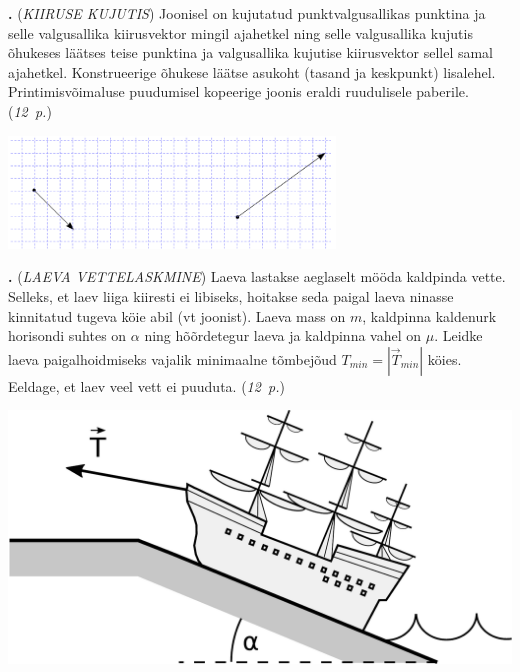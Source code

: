 \documentclass[11pt,a5paper]{article}
\newcommand{\numb}[1]{\vspace{5pt}\textbf{\large #1}}
\newcommand{\nimi}[1]{(\textsl{\small #1})}
\newcommand{\punktid}[1]{(\emph{#1~p.})}
\newcommand{\autor}[1]{}
\newcounter{ylesanne}
\newcommand{\yl}[1]{\addtocounter{ylesanne}{1}\numb{\theylesanne.} \nimi{#1} \newblock{}}
\begin{document}
\yl{KIIRUSE KUJUTIS}
Joonisel on kujutatud punktvalgusallikas punktina ja selle valgusallika kiirusvektor mingil ajahetkel ning selle valgusallika kujutis õhukeses läätses teise punktina ja valgusallika kujutise kiirusvektor sellel samal ajahetkel. Konstrueerige õhukese läätse asukoht (tasand ja keskpunkt) lisalehel. Printimisvõimaluse puudumisel kopeerige joonis eraldi ruudulisele paberile.
\punktid{12} \autor{Jaan Kalda}
\begin{center}
	\includegraphics[width=0.65\textwidth]{lxxts-kiirused_.pdf}
\end{center}

\newpage
\yl{LAEVA VETTELASKMINE}
Laeva lastakse aeglaselt mööda kaldpinda vette. Selleks, et laev liiga kiiresti ei libiseks, hoitakse seda paigal laeva ninasse kinnitatud tugeva köie abil (vt joonist). Laeva mass on $m$,  kaldpinna kaldenurk horisondi suhtes on $\alpha$ ning hõõrdetegur laeva ja kaldpinna vahel on $\mu$. Leidke laeva paigalhoidmiseks vajalik minimaalne tõmbejõud $T_{min}=|\overrightarrow{T}_{min}|$ köies. Eeldage, et laev veel vett ei puuduta.
\punktid{12} \autor{Päivo Simson}
\begin{center}
	\includegraphics[width=0.4\linewidth]{laev_03.pdf}
\end{center}
\end{document}
